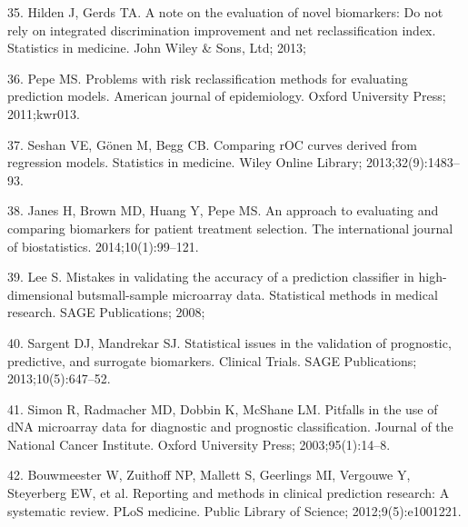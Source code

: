 \documentclass[11pt]{article}
\begin{document}
35. Hilden J, Gerds TA. A note on the evaluation of novel biomarkers: Do
not rely on integrated discrimination improvement and net
reclassification index. Statistics in medicine. John Wiley \& Sons, Ltd;
2013;

36. Pepe MS. Problems with risk reclassification methods for evaluating
prediction models. American journal of epidemiology. Oxford University
Press; 2011;kwr013.

37. Seshan VE, G{ö}nen M, Begg CB. Comparing rOC curves derived from
regression models. Statistics in medicine. Wiley Online Library;
2013;32(9):1483--93.

38. Janes H, Brown MD, Huang Y, Pepe MS. An approach to evaluating and
comparing biomarkers for patient treatment selection. The international
journal of biostatistics. 2014;10(1):99--121.

39. Lee S. Mistakes in validating the accuracy of a prediction
classifier in high-dimensional butsmall-sample microarray data.
Statistical methods in medical research. SAGE Publications; 2008;

40. Sargent DJ, Mandrekar SJ. Statistical issues in the validation of
prognostic, predictive, and surrogate biomarkers. Clinical Trials. SAGE
Publications; 2013;10(5):647--52.

41. Simon R, Radmacher MD, Dobbin K, McShane LM. Pitfalls in the use of
dNA microarray data for diagnostic and prognostic classification.
Journal of the National Cancer Institute. Oxford University Press;
2003;95(1):14--8.

42. Bouwmeester W, Zuithoff NP, Mallett S, Geerlings MI, Vergouwe Y,
Steyerberg EW, et al. Reporting and methods in clinical prediction
research: A systematic review. PLoS medicine. Public Library of Science;
2012;9(5):e1001221.
\end{document}
